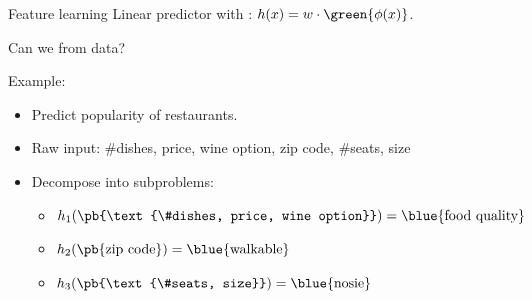 \documentclass[usenames,dvipsnames,notes,11pt,aspectratio=169]{beamer}
\newcommand{\pdfnote}[1]{}
\begin{document}
\begin{frame}
    {Feature learning}
    Linear predictor with : $h(x) = w\cdot\green{\phi(x)}$.

    Can we  from data?
    \pause

    Example:\\
    \begin{itemize}
    \item Predict popularity of restaurants.
    \item Raw input: \#dishes, price, wine option, zip code, \#seats, size 
    \item Decompose into subproblems:
    \begin{itemize}
        \itemsep2ex
        \item[] ${h_1}(\pb{\text{\#dishes, price, wine option}}) = \text{\blue{food quality}}$
        \item[] ${h_2}(\pb{\text{zip code}}) = \text{\blue{walkable}}$
        \item[] ${h_3}(\pb{\text{\#seats, size}}) = \text{\blue{nosie}}$
    \end{itemize}
    \end{itemize}
\pdfnote{Let's try to represent our model as a graph. So we have nodes representing each input, nodes representing the intermediate predictors which takes in a subset of inputs, and the node representing the linear classifier that computes the output.}
\pdfnote{The subproblems are manually specified based on our knowledge of the problem. 
In fact, feature engineering is an important step when building practical ML models, but in this course so far we have ignored that part and assume they are given to use.
But we don't always have this knowledge, or our features aren't good, or we simply want to automate as many steps as possible.
It would be desirable if we can directly learn these subproblems.}
\end{frame}
\end{document}

